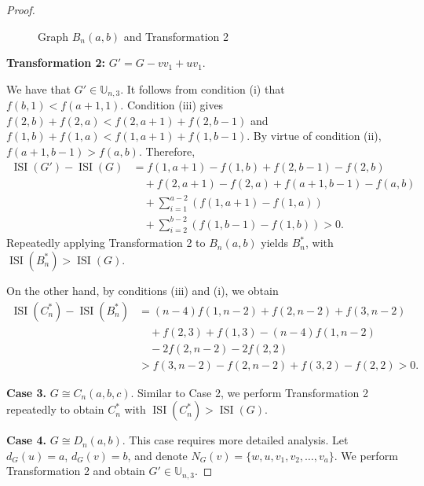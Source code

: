 \documentclass[12pt]{article}
\theoremstyle{definition}
\newcommand{\ISI}{\operatorname{ISI}}
\newcommand{\UU}{\mathbb{U}}
\begin{document}
\begin{proof}
\begin{figure}[h]
\caption{Graph \(B_n(a,b)\) and Transformation 2}
\label{fig:Bn}
\end{figure}

\textbf{Transformation 2:} \(G' = G - vv_1 + uv_1\).

We have that \(G' \in \UU_{n,3}\). It follows from condition (i) that \(f(b,1) < f(a+1,1)\). Condition (iii) gives \(f(2,b) + f(2,a) < f(2,a+1) + f(2,b-1)\) and \(f(1,b) + f(1,a) < f(1,a+1) + f(1,b-1)\). By virtue of condition (ii), \(f(a+1,b-1) > f(a,b)\). Therefore,
\begin{align*}
\ISI(G') - \ISI(G) &= f(1,a+1) - f(1,b) + f(2,b-1) - f(2,b) \\
&\quad + f(2,a+1) - f(2,a) + f(a+1,b-1) - f(a,b) \\
&\quad + \sum_{i=1}^{a-2}(f(1,a+1) - f(1,a)) \\
&\quad + \sum_{i=2}^{b-2}(f(1,b-1) - f(1,b)) > 0.
\end{align*}
Repeatedly applying Transformation 2 to \(B_n(a,b)\) yields \(B_n^*\), with \(\ISI(B_n^*) > \ISI(G)\).

On the other hand, by conditions (iii) and (i), we obtain
\begin{align*}
\ISI(C_n^*) - \ISI(B_n^*) &= (n-4)f(1,n-2) + f(2,n-2) + f(3,n-2) \\
&\quad + f(2,3) + f(1,3) - (n-4)f(1,n-2) \\
&\quad - 2f(2,n-2) - 2f(2,2) \\[4pt]
&> f(3,n-2) - f(2,n-2) + f(3,2) - f(2,2) > 0.
\end{align*}

\textbf{Case 3.} \(G \cong C_n(a,b,c)\). Similar to Case 2, we perform Transformation 2 repeatedly to obtain \(C_n^*\) with \(\ISI(C_n^*) > \ISI(G)\).

\textbf{Case 4.} \(G \cong D_n(a,b)\). This case requires more detailed analysis. Let \(d_G(u) = a\), \(d_G(v) = b\), and denote \(N_G(v) = \{w, u, v_1, v_2, \ldots, v_a\}\). We perform Transformation 2 and obtain \(G' \in \UU_{n,3}\).


\end{proof}
\end{document}
